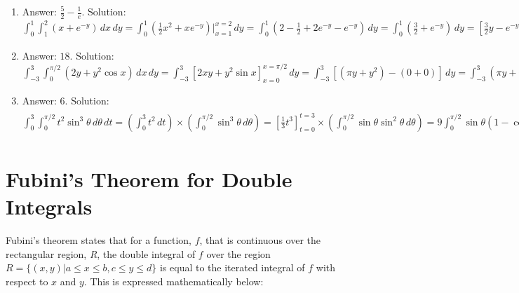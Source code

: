 \begin{Answer}[ref = iterate_2]
\begin{enumerate}
\item Answer: $\frac{5}{2} - \frac{1}{e}$. Solution: $\int_0^1 \int_1^2 \left( 
x + e^{-y} \right)\,dx\,dy = \int_0^1 \left( \frac{1}{2}x^2 + xe^{-y} \right)
|_{x=1}^{x=2}\,dy = \int_0^1 \left( 2 - \frac{1}{2} + 2e^{-y} - e^{-y} \right)
\,dy = \int_0^1 \left( \frac{3}{2} + e^{-y} \right)\,dy = \left[ \frac{3}{2}y 
- e^{-y} \right]_{y = 0}^{y = 1} = \left( \frac{3}{2}(1) - e^{-1} \right) - 
\left( \frac{3}{2}(0) - e^0 \right) = \frac{5}{2} - \frac{1}{e}$
\item Answer: $18$. Solution: $\int_{-3}^3 \int_{0}^{\pi/2} \left( 2y + y^2 
\cos{x} \right)\,dx\,dy = \int_{-3}^3 \left[ 2xy + y^2 \sin{x} \right]_{x = 0}^
{x = \pi/2}\,dy = \int_{-3}^3 \left[ \left( \pi y + y^2 \right) - \left( 0 + 0 
\right) \right]\,dy = \int_{-3}^3 \left( \pi y + y^2 \right)\,dy = \left[ 
\frac{\pi}{2}y^2 + \frac{1}{3}y^3 \right]_{y = -3}^{y = 3} = \left( \frac{\pi}{
2}(9) + \frac{1}{3}(27) \right) - \left( \frac{\pi}{2}(9) + \frac{1}{3}(-27) 
\right) = 9 - (-9) = 18$
\item Answer: $6$. Solution: $\int_0^3 \int_0^{\pi/2} t^2 \sin^3{\theta}\,
d\theta\,dt = \left( \int_0^3 t^2\,dt \right) \times \left( \int_0^{\pi/2} 
\sin^3{\theta}\,d\theta \right) = \left[ \frac{1}{3}t^3 \right]_{t = 0}^{t = 3}
\times \left( \int_0^{\pi/2} \sin{\theta} \sin^2{\theta}\,d\theta \right) = 9
\int_0^{\pi/2} \sin{\theta} \left( 1 - \cos^2{\theta} \right)\,d\theta = 9 
\left[ \int_0^{\pi/2} \sin{\theta}\,d\theta - \int_0^{\pi/2} \sin{\theta}
\cos^2{\theta}\,d\theta \right] = 9 \left[ \left( -\cos{\theta} \right) |_{
\theta = 0}^{\theta = \pi/2} + \left( \frac{1}{3}\cos^3{\theta} \right)|_{
\theta = 0}^{\theta = \pi/2} \right] = 9 \left[ -(-\cos{0}) + (-\frac{1}{3}
\cos^3{0}) \right] = 9 \left( 1 - \frac{1}{3} \right) = 9 \left( \frac{2}{3} 
\right) = 6$
\end{enumerate}
\end{Answer}

\section{Fubini's Theorem for Double Integrals}

Fubini's theorem states that for a 
function, $f$, that is continuous over the rectangular region, \textit{R}, the 
double integral of $f$ over the region $\textit{R} = \{ (x, y) | a \leq x \leq 
b, c \leq y \leq d\}$ is equal to the iterated integral of $f$ with respect to 
$x$ and $y$. This is expressed mathematically below:

